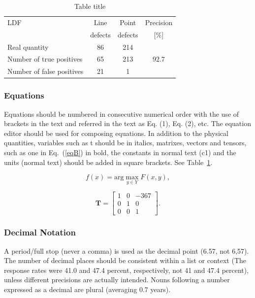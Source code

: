 \documentclass[10pt]{JoME}
\begin{document}
\begin{table}[h]
\caption{Table title\label{tabA}}
\medskip\fontsize{10}{12}\selectfont
\begin{tabular}{lccc}
\hline
LDF	& Line &	Point  & Precision \\
          &  defects &  defects  &  [\%] \\
\hline
Real quantity  & 86   &  214  &   \\ \cline{1-3}
Number of true positives  & 65	& 213 &  92.7  \\  \cline{1-3} 	
Number of false positives & 21 & 1	\\
\hline
\end{tabular}
\end{table}

\subsubsection{Equations}

Equations should be numbered in consecutive numerical order with the use of brackets in the text and referred in the text as Eq. (1), Eq. (2), etc. The equation editor should be used for composing equations. In addition to the physical quantities, variables such as t should be in italics, matrixes, vectors and tensors, such as one in Eq.~(\ref{eqB}) in bold, the constants in normal text (c1) and the units (normal text) should be added in square brackets. See Table~\ref{tabA}.

\begin{equation}\label{eqA}
f(x) = \mbox{arg}\max_{y \in Y} F(x,y),
\end{equation}

\begin{equation}\label{eqB}
\mathbf{T} = \left[\begin{array}{ccc} 1 & 0 & -367 \\  0 & 1 & 0 \\ 0 & 0 & 1 \end{array}\right].
\end{equation}


\subsubsection{Decimal Notation}

A period/full stop (never a comma) is used as the decimal point (6.57, not 6,57). The number of decimal places should be consistent within a list or context (The response rates were 41.0 and 47.4 percent, respectively, not 41 and 47.4 percent), unless different precisions are actually intended. Nouns following a number expressed as a decimal are plural (averaging 0.7 years).
\end{document}
